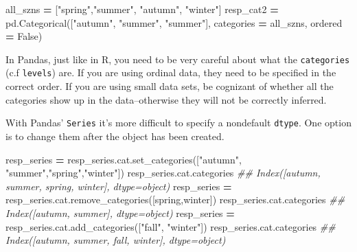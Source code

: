 \documentclass[
  12pt,
  krantz2]{krantz}
\makeatletter
\newenvironment{Shaded}{\begin{snugshade}}{\end{snugshade}}
\newcommand{\CommentTok}[1]{\textcolor[rgb]{0.37,0.37,0.37}{\textit{#1}}}
\newcommand{\NormalTok}[1]{#1}
\newcommand{\OperatorTok}[1]{\textcolor[rgb]{0.43,0.43,0.43}{\textbf{#1}}}
\newcommand{\StringTok}[1]{\textcolor[rgb]{0.5,0.5,0.5}{#1}}
\newcommand{\VariableTok}[1]{\textcolor[rgb]{0,0,0}{#1}}
\newenvironment{kframe}{%
\medskip{}
\setlength{\fboxsep}{.8em}
 \def\at@end@of@kframe{}%
 \ifinner\ifhmode%
  \def\at@end@of@kframe{\end{minipage}}%
  \begin{minipage}{\columnwidth}%
 \fi\fi%
 \def\FrameCommand##1{\hskip\@totalleftmargin \hskip-\fboxsep
 \colorbox{shadecolor}{##1}\hskip-\fboxsep
     \hskip-\linewidth \hskip-\@totalleftmargin \hskip\columnwidth}%
 \MakeFramed {\advance\hsize-\width
   \@totalleftmargin\z@ \linewidth\hsize
   \@setminipage}}%
 {\par\unskip\endMakeFramed%
 \at@end@of@kframe}
\renewenvironment{Shaded}{\begin{kframe}}{\end{kframe}}
\makeatother
\begin{document}
\begin{Shaded}
\begin{Highlighting}[]
\NormalTok{all\_szns }\OperatorTok{=}\NormalTok{ [}\StringTok{"spring"}\NormalTok{,}\StringTok{"summer"}\NormalTok{, }\StringTok{"autumn"}\NormalTok{, }\StringTok{"winter"}\NormalTok{]}
\NormalTok{resp\_cat2 }\OperatorTok{=}\NormalTok{ pd.Categorical([}\StringTok{"autumn"}\NormalTok{, }\StringTok{"summer"}\NormalTok{, }\StringTok{"summer"}\NormalTok{], }
\NormalTok{                            categories }\OperatorTok{=}\NormalTok{ all\_szns, }
\NormalTok{                            ordered }\OperatorTok{=} \VariableTok{False}\NormalTok{)}
\end{Highlighting}
\end{Shaded}

In Pandas, just like in R, you need to be very careful about what the \texttt{categories} (c.f \texttt{levels}) are. If you are using ordinal data, they need to be specified in the correct order. If you are using small data sets, be cognizant of whether all the categories show up in the data--otherwise they will not be correctly inferred.

With Pandas' \texttt{Series} it's more difficult to specify a nondefault \texttt{dtype}. One option is to change them after the object has been created.

\begin{Shaded}
\begin{Highlighting}[]
\NormalTok{resp\_series }\OperatorTok{=}\NormalTok{ resp\_series.cat.set\_categories([}\StringTok{"autumn"}\NormalTok{, }\StringTok{"summer"}\NormalTok{,}\StringTok{"spring"}\NormalTok{,}\StringTok{"winter"}\NormalTok{])}
\NormalTok{resp\_series.cat.categories}
\CommentTok{\#\# Index([\textquotesingle{}autumn\textquotesingle{}, \textquotesingle{}summer\textquotesingle{}, \textquotesingle{}spring\textquotesingle{}, \textquotesingle{}winter\textquotesingle{}], dtype=\textquotesingle{}object\textquotesingle{})}
\NormalTok{resp\_series }\OperatorTok{=}\NormalTok{ resp\_series.cat.remove\_categories([}\StringTok{\textquotesingle{}spring\textquotesingle{}}\NormalTok{,}\StringTok{\textquotesingle{}winter\textquotesingle{}}\NormalTok{])}
\NormalTok{resp\_series.cat.categories}
\CommentTok{\#\# Index([\textquotesingle{}autumn\textquotesingle{}, \textquotesingle{}summer\textquotesingle{}], dtype=\textquotesingle{}object\textquotesingle{})}
\NormalTok{resp\_series }\OperatorTok{=}\NormalTok{ resp\_series.cat.add\_categories([}\StringTok{"fall"}\NormalTok{, }\StringTok{"winter"}\NormalTok{])}
\NormalTok{resp\_series.cat.categories}
\CommentTok{\#\# Index([\textquotesingle{}autumn\textquotesingle{}, \textquotesingle{}summer\textquotesingle{}, \textquotesingle{}fall\textquotesingle{}, \textquotesingle{}winter\textquotesingle{}], dtype=\textquotesingle{}object\textquotesingle{})}
\end{Highlighting}
\end{Shaded}
\end{document}
